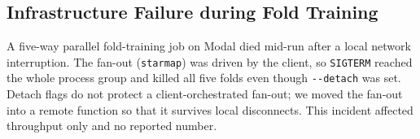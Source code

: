 \subsection{Infrastructure Failure during Fold Training}
\label{app:t1-detach}

A five-way parallel fold-training job on Modal died mid-run after a local network
interruption. The fan-out (\texttt{starmap}) was driven by the client, so
\texttt{SIGTERM} reached the whole process group and killed all five folds even though
\texttt{-{}-detach} was set. Detach flags do not protect a client-orchestrated fan-out;
we moved the fan-out into a remote function so that it survives local disconnects.
This incident affected throughput only and no reported number.
